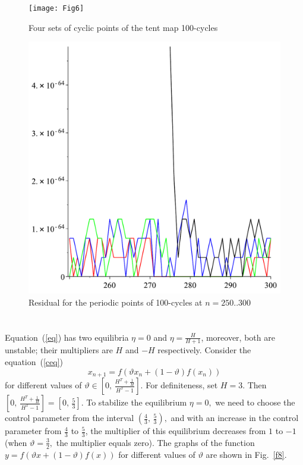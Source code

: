 \documentclass[12pt,a4paper]{amsart}
\begin{document}
\begin{figure}[h!]
\centering
\texttt{[image: Fig6]}
\caption{Four sets of cyclic points of the tent map 100-cycles} \label{f6}
\end{figure}

\begin{figure}[h!]
\centering
\includegraphics[scale=0.28]{Fig7}
\caption{Residual for the periodic points of 100-cycles at $n=250..300$} \label{f7}
\end{figure}

\section{}

Equation~(\ref{eq}) has two equilibria $\eta = 0$ and $\eta = \frac{H}{H+1}$, moreover, both are unstable; 
their multipliers are $H$ and $-H$ respectively. Consider the equation~(\ref{ceq})
$$
x_{n+1} = f \left( \vartheta x_n + (1 - \vartheta)f(x_n) \right)
$$
for different values of $\vartheta \in \left[0,\, \frac{H^T + \frac{1}{H}}{H^T-1}\right].$ For definiteness, set $H=3.$
Then $\left[0,\, \frac{H^T + \frac{1}{H}}{H^T-1}\right] = \left[ 0,\,\frac53\right].$ To stabilize the equilibrium $\eta=0,$
we need to choose the control parameter from the interval $\left(\frac43,\,\frac53\right),$ and with an increase 
in the control parameter from $\frac43$ to $\frac53$, the multiplier of this equilibrium decreases from $1$ to $-1$ 
(when $\vartheta=\frac32,$ the multiplier equals zero). The graphs of the function 
$y = f \left( \vartheta x + (1 - \vartheta)f(x) \right)$ for different values of $\vartheta$ are shown in Fig.~\ref{f8}.
\end{document}
